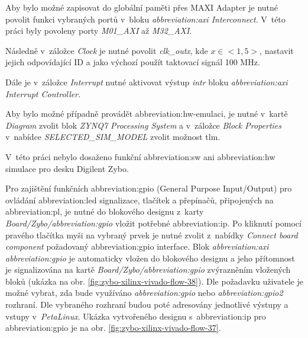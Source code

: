 \documentclass[a4paper, twoside, 11pt]{article}
\begin{document}
\begin{appendices}
		Aby bylo možné zapisovat do globální paměti přes MAXI Adapter je nutné povolit funkci vybraných portů v~bloku \textit{\gls{abbreviation:axi} Interconnect}. V~této práci byly povoleny porty \textit{M01\_AXI} až \textit{M32\_AXI}.\par
		Následně v~záložce \textit{Clock} je nutné povolit \textit{clk\_outx}, kde $x \in <1,5>$, nastavit jejich odpovídající ID a jako výchozí použít taktovací signál 100 MHz.\par
		Dále je v~záložce \textit{Interrupt} nutné aktivovat výstup \textit{intr} bloku \textit{\gls{abbreviation:axi} Interrupt Controller}.\par
		Aby bylo možné případně provádět \gls{abbreviation:hw}-emulaci, je nutné v~kartě \textit{Diagram} zvolit blok \textit{ZYNQ7 Processing System} a v~záložce \textit{Block Properties} v~nabídce \textit{SELECTED\_SIM\_MODEL} zvolit možnost tlm. \cite{hackster-vitis-2021-1-embedded-platform-for-zybo-z7-20}\par
		V~této práci nebylo dosaženo funkční \gls{abbreviation:sw} ani \gls{abbreviation:hw} simulace pro desku Digilent Zybo.\par
		Pro zajištění funkčních \gls{abbreviation:gpio} (General Purpose Input/Output) pro ovládání \gls{abbreviation:led} signalizace, tlačítek a přepínačů, připojených na \gls{abbreviation:pl}, je nutné do blokového designu z~karty \textit{Board/Zybo/\gls{abbreviation:gpio}} vložit potřebné \gls{abbreviation:ip}. Po kliknutí pomocí pravého tlačítka myši na vybraný prvek je nutné zvolit z~nabídky \textit{Connect board component} požadovaný \gls{abbreviation:gpio} interface. Blok \textit{\gls{abbreviation:axi} \gls{abbreviation:gpio}} je automaticky vložen do blokového designu a jeho přítomnost je signalizována na kartě \textit{Board/Zybo/\gls{abbreviation:gpio}} zvýrazněním vložených bloků (ukázka na obr. \ref{fig:zybo-xilinx-vivado-flow-38}). Dle požadavku uživatele je možné vybrat, zda bude využíváno \textit{\gls{abbreviation:gpio}} nebo \textit{\gls{abbreviation:gpio}2} rozhraní. Dle vybraného rozhraní budou poté adresovány jednotlivé výstupy a vstupy v~\textit{PetaLinux}. Ukázka vytvořeného designu s~\gls{abbreviation:ip} pro \gls{abbreviation:gpio} je na obr. \ref{fig:zybo-xilinx-vivado-flow-37}.



\end{appendices}
\end{document}
